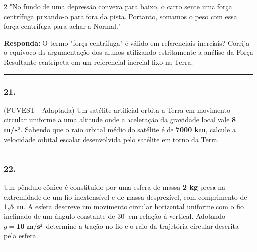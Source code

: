 \documentclass[twoside, 10pt, a4paper]{article}
\newlength{\espacoPreQuestao}\setlength{\espacoPreQuestao}{0.1cm}
\newlength{\espacoQuestao}\setlength{\espacoQuestao}{0.2cm}
\begin{document}
\begin{multicols*}{2}
"No fundo de uma depressão convexa para baixo, o carro sente uma força centrífuga puxando-o para fora da pista. Portanto, somamos o peso com essa força centrífuga para achar a Normal."

\begin{boxresponda}
\textbf{Responda:} O termo "força centrífuga" é válido em referenciais inerciais? Corrija o equívoco da argumentação dos alunos utilizando estritamente a análise da Força Resultante centrípeta em um referencial inercial fixo na Terra.
\end{boxresponda}
\par\vspace{\espacoQuestao}

\noindent\textcolor{CorLinha}{\rule{\linewidth}{0.5pt}} 
\par\vspace{\espacoPreQuestao}
\subsubsection*{21.} (FUVEST - Adaptada) Um satélite artificial orbita a Terra em movimento circular uniforme a uma altitude onde a aceleração da gravidade local vale \textbf{8 m/s²}. Sabendo que o raio orbital médio do satélite é de \textbf{7000 km}, calcule a velocidade orbital escalar desenvolvida pelo satélite em torno da Terra.
\par\vspace{\espacoQuestao}

\noindent\textcolor{CorLinha}{\rule{\linewidth}{0.5pt}} 
\par\vspace{\espacoPreQuestao}
\subsubsection*{22.} Um pêndulo cônico é constituído por uma esfera de massa \textbf{2 kg} presa na extremidade de um fio inextensível e de massa desprezível, com comprimento de \textbf{1,5 m}. A esfera descreve um movimento circular horizontal uniforme com o fio inclinado de um ângulo constante de $30^\circ$ em relação à vertical. Adotando $g = \textbf{10 m/s²}$, determine a tração no fio e o raio da trajetória circular descrita pela esfera.
\par\vspace{\espacoQuestao}

\noindent\textcolor{CorLinha}{\rule{\linewidth}{0.5pt}} 
\par\vspace{\espacoPreQuestao}

\end{multicols*}
\end{document}
